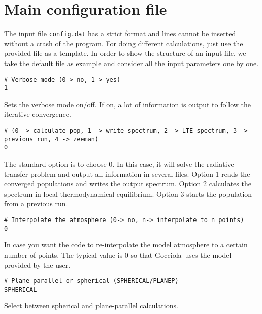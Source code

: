 \documentclass[12pt]{article}
\def\G{Gocciola}
\begin{document}
\section{Main configuration file}



The input file {\tt config.dat} has a strict format and lines cannot
be inserted without a crash of the program. For doing different calculations,
just use the provided file as a template. In order to show the structure of an input file, we take
the default file as example and consider all the input
parameters one by one.

\begin{footnotesize} \begin{verbatim}
# Verbose mode (0-> no, 1-> yes)
1
\end{verbatim} \end{footnotesize}
Sets the verbose mode on/off. If on, a lot of information is output to follow the iterative
convergence.

\begin{footnotesize} \begin{verbatim}
# (0 -> calculate pop, 1 -> write spectrum, 2 -> LTE spectrum, 3 -> previous run, 4 -> zeeman)
0
\end{verbatim} \end{footnotesize}
The standard option is to choose 0. In this case, it will solve the radiative
transfer problem and output all information in several files. Option 1 reads the
converged populations and writes the output spectrum. Option 2 calculates the spectrum
in local thermodynamical equilibrium. Option 3 starts the population from
a previous run.

\begin{footnotesize} \begin{verbatim}
# Interpolate the atmosphere (0-> no, n-> interpolate to n points)
0
\end{verbatim} \end{footnotesize}
In case you want the code to re-interpolate the model atmosphere to a certain
number of points. The typical value is 0 so that \G\ uses the model
provided by the user.

\begin{footnotesize} \begin{verbatim}
# Plane-parallel or spherical (SPHERICAL/PLANEP)
SPHERICAL
\end{verbatim} \end{footnotesize}
Select between spherical and plane-parallel calculations.
\end{document}
